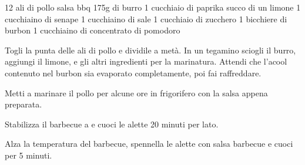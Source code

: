 \begin{ingreds}
	12 ali di pollo
	salsa bbq
\columnbreak
{}
	175g di burro
	1 cucchiaio di paprika
	succo di un limone
	1 cucchiaino di senape
	1 cucchiaino di sale
	1 cucchiaio di zucchero
	1 bicchiere di burbon
	1 cucchiaino di concentrato di pomodoro
\end{ingreds}

\begin{method}
	Togli la punta delle ali di pollo e dividile a metà. In un tegamino sciogli il burro, aggiungi il limone, e gli altri ingredienti per la marinatura. Attendi che l'acool contenuto nel burbon sia evaporato completamente, poi fai raffreddare.

	Metti a marinare il pollo per alcune ore in frigorifero con la salsa appena preparata.

	Stabilizza il barbecue a  e cuoci le alette 20 minuti per lato.

	Alza la temperatura del barbecue, spennella le alette con salsa barbecue e cuoci per 5 minuti.
\end {method}
